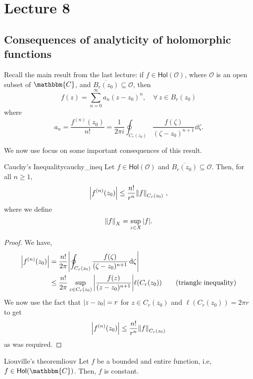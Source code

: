 \documentclass[../ComplexAnalysis_Notes.tex]{subfiles}
\begin{document}
\chapter*{Lecture 8} %
\setcounter{chapter}{8} %
\setcounter{section}{0}
\setcounter{equation}{0}
\setcounter{figure}{0}

\section{Consequences of analyticity of holomorphic functions}

Recall the main result from the last lecture: if \( f \in \textsf{Hol}(\mathcal{O}) \), where \( \mathcal{O} \) is an open subset of \( \mathbbm{C} \), and \( \overline{B_r(z_0)} \subseteq \mathcal{O} \), then
\[ 
 f(z) = \sum_{n=0}^{\infty} a_n (z-z_0)^n, \quad \forall \, z \in B_r(z_0)
 \]
 where 
 \[ 
  a_n = \frac{f^{(n)}(z_0)}{n!} = \frac{1}{2\pi i} \oint_{C_r(z_0)} \frac{f(\zeta)}{(\zeta-z_0)^{n+1}} \dd{\zeta}.
  \]

We now use focus on some important consequences of this result.

\begin{Thm}{Cauchy's Inequality}{cauchy_ineq}
 Let \( f \in \textsf{Hol}(\mathcal{O}) \) and \( \overline{B_r(z_0)} \subseteq \mathcal{O} \). Then, for all \( n \geq 1 \),
 \[ 
  \abs{f^{(n)}(z_0)} \leq \frac{n!}{r^n} \norm{f}_{C_r(z_0)}\ ,
  \]
  where we define
  \[ 
   \norm{f}_X = \sup_{z \in X} \abs{f}.
   \]
 \end{Thm}

\begin{proof} 
 We have,
 \begin{align*}
  \abs{f^{(n)}(z_0)}
  &= \frac{n!}{2\pi } \abs{\oint_{C_r(z_0)} \frac{f(\zeta)}{(\zeta-z_0)^{n+1}} \dd{\zeta}} \\
  &\leq \frac{n!}{2\pi } \sup_{z \in C_r(z_0)} \abs{\frac{f(z)}{(z-z_0)^{n+1}}} \ell(C_r(z_0)) \tag{triangle inequality}
 \end{align*}
 We now use the fact that \( \abs{z-z_0} = r \) for \( z \in C_r(z_0) \) and \( \ell(C_r(z_0)) = 2\pi r \) to get
 \[ 
  \abs{f^{(n)}(z_0)} \leq \frac{n!}{r^n} \norm{f}_{C_r(z_0)}
  \]
  as was required.
 \end{proof}

\begin{Thm}{Liouville's theorem}{liouv}
 Let \( f \) be a bounded and entire function, i.e, \( f \in \textsf{Hol}(\mathbbm{C}) \). Then, \( f \) is constant.
 \end{Thm}
\end{document}

